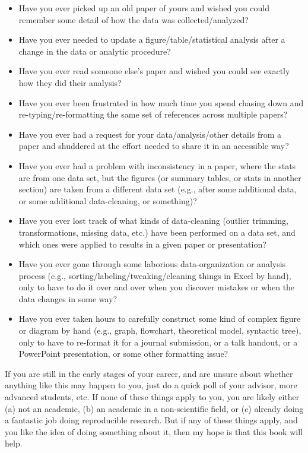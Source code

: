\documentclass[11pt]{book}
\begin{document}
\begin{itemize}
\item Have you ever picked up an old paper of yours and wished you could remember some detail of how the data was collected/analyzed?
\item Have you ever needed to update a figure/table/statistical analysis after a change in the data or analytic procedure?
\item Have you ever read someone else's paper and wished you could see exactly how they did their analysis?
\item Have you ever been frustrated in how much time you spend chasing down and re-typing/re-formatting the same set of references across multiple papers?
\item Have you ever had a request for your data/analysis/other details from a paper and shuddered at the effort needed to share it in an accessible way?
\item Have you ever had a problem with inconsistency in a paper, where the stats are from one data set, but the figures (or summary tables, or stats in another section) are taken from a different data set (e.g., after some additional data, or some additional data-cleaning, or something)?
\item Have you ever lost track of what kinds of data-cleaning (outlier trimming, transformations, missing data, etc.) have been performed on a data set, and which ones were applied to results in a given paper or presentation?
\item Have you ever gone through some laborious data-organization or analysis process (e.g., sorting/labeling/tweaking/cleaning things in Excel by hand), only to have to do it over and over when you discover mistakes or when the data changes in some way?
\item Have you ever taken hours to carefully construct some kind of complex figure or diagram by hand (e.g., graph, flowchart, theoretical model, syntactic tree), only to have to re-format it for a journal submission, or a talk handout, or a PowerPoint presentation, or some other formatting issue?
\end{itemize}

If you are still in the early stages of your career, and are unsure about whether anything like this may happen to you, just do a quick poll of your advisor, more advanced students, etc. If none of these things apply to you, you are likely either (a) not an academic, (b) an academic in a non-scientific field, or (c) already doing a fantastic job doing reproducible research.  But if any of these things apply, and you like the idea of doing something about it, then my hope is that this book will help.
\end{document}
